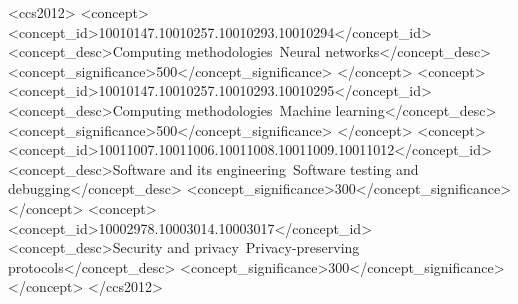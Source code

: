 \begin{CCSXML}
<ccs2012>
  <concept>
    <concept_id>10010147.10010257.10010293.10010294</concept_id>
    <concept_desc>Computing methodologies~Neural networks</concept_desc>
    <concept_significance>500</concept_significance>
  </concept>
  <concept>
    <concept_id>10010147.10010257.10010293.10010295</concept_id>
    <concept_desc>Computing methodologies~Machine learning</concept_desc>
    <concept_significance>500</concept_significance>
  </concept>
  <concept>
    <concept_id>10011007.10011006.10011008.10011009.10011012</concept_id>
    <concept_desc>Software and its engineering~Software testing and debugging</concept_desc>
    <concept_significance>300</concept_significance>
  </concept>
  <concept>
    <concept_id>10002978.10003014.10003017</concept_id>
    <concept_desc>Security and privacy~Privacy-preserving protocols</concept_desc>
    <concept_significance>300</concept_significance>
  </concept>
</ccs2012>
\end{CCSXML}

